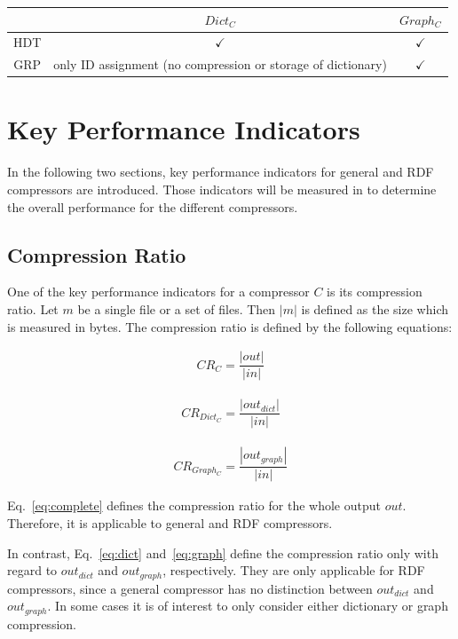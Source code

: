 \begin{center}
	\begin{tabular}{|c|c|c|}
		\hline 
		& $Dict_{C}$ & $Graph_{C}$ \\ 
		\hline \hline
		HDT & $\checkmark$ & $\checkmark$  \\ 
		\hline 
		GRP & only ID assignment (no compression or storage of dictionary) & $\checkmark$ \\ 
		\hline 
	\end{tabular} 
	\label{tab:compressorsOverview}
\end{center}

\section{Key Performance Indicators}

In the following two sections, key performance indicators for general and RDF compressors are introduced. Those indicators will be measured in to determine the overall performance for the different compressors.

\subsection{Compression Ratio}

One of the key performance indicators for a compressor $C$ is its compression ratio. Let $m$ be a single file or a set of files. Then $|m|$ is defined as the size which is measured in bytes. The compression ratio is defined by the following equations:

\begin{align}
CR_{C} = \dfrac{|out|}{ |in|} \label{eq:complete}
\end{align}

\begin{align}
CR_{Dict_C} = \dfrac{|out_{dict}|}{ |in|} \label{eq:dict}
\end{align}

\begin{align}
CR_{Graph_C} = \dfrac{|out_{graph}|}{ |in|} \label{eq:graph}
\end{align}

Eq.~\ref{eq:complete} defines the compression ratio for the whole output $out$. Therefore, it is applicable to general and RDF compressors.

In contrast, Eq.~\ref{eq:dict} and~\ref{eq:graph} define the compression ratio only with regard to $out_{dict}$ and $out_{graph}$, respectively. They are only applicable for RDF compressors, since a general compressor has no distinction between $out_{dict}$ and $out_{graph}$. In some cases it is of interest to only consider either dictionary or graph compression.

